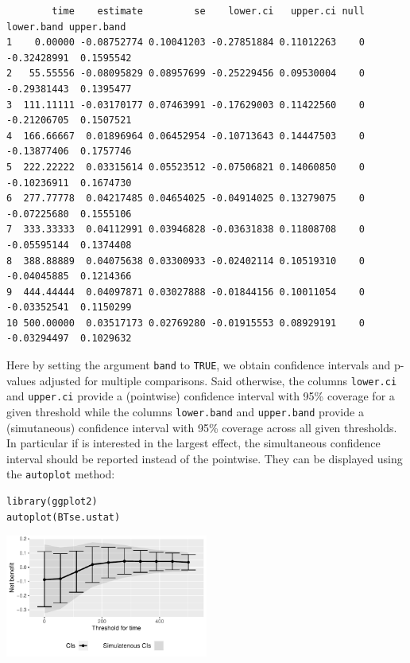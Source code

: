\documentclass[12pt]{article}
\begin{document}
\begin{verbatim}
        time    estimate         se    lower.ci   upper.ci null  lower.band upper.band
1    0.00000 -0.08752774 0.10041203 -0.27851884 0.11012263    0 -0.32428991  0.1595542
2   55.55556 -0.08095829 0.08957699 -0.25229456 0.09530004    0 -0.29381443  0.1395477
3  111.11111 -0.03170177 0.07463991 -0.17629003 0.11422560    0 -0.21206705  0.1507521
4  166.66667  0.01896964 0.06452954 -0.10713643 0.14447503    0 -0.13877406  0.1757746
5  222.22222  0.03315614 0.05523512 -0.07506821 0.14060850    0 -0.10236911  0.1674730
6  277.77778  0.04217485 0.04654025 -0.04914025 0.13279075    0 -0.07225680  0.1555106
7  333.33333  0.04112991 0.03946828 -0.03631838 0.11808708    0 -0.05595144  0.1374408
8  388.88889  0.04075638 0.03300933 -0.02402114 0.10519310    0 -0.04045885  0.1214366
9  444.44444  0.04097871 0.03027888 -0.01844156 0.10011054    0 -0.03352541  0.1150299
10 500.00000  0.03517173 0.02769280 -0.01915553 0.08929191    0 -0.03294497  0.1029632
\end{verbatim}

Here by setting the argument \texttt{band} to \texttt{TRUE}, we obtain confidence
intervals and p-values adjusted for multiple comparisons. Said
otherwise, the columns \texttt{lower.ci} and \texttt{upper.ci} provide a (pointwise)
confidence interval with 95\% coverage for a given threshold while the
columns \texttt{lower.band} and \texttt{upper.band} provide a (simutaneous)
confidence interval with 95\% coverage across all given thresholds. In
particular if is interested in the largest effect, the simultaneous
confidence interval should be reported instead of the pointwise. They
can be displayed using the \texttt{autoplot} method:
\lstset{language=r,label= ,caption= ,captionpos=b,numbers=none}
\begin{lstlisting}
library(ggplot2)
autoplot(BTse.ustat)
\end{lstlisting}

\begin{center}
\includegraphics[width=0.5\textwidth]{./figures/gg-sensitivity1.pdf}
\end{center}
\end{document}
